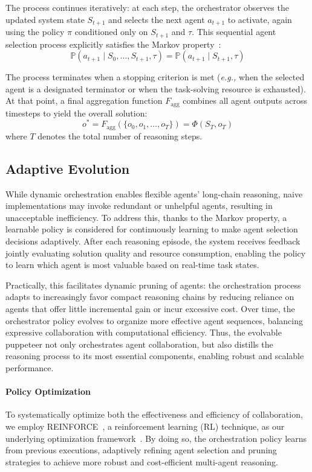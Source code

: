 \documentclass{article}
\newcommand{\eg}{\textit{e.g., }}
\begin{document}
The process continues iteratively: at each step, the orchestrator observes the updated system state \(S_{t+1}\) and selects the next agent \(a_{t+1}\) to activate, again using the policy \(\pi\) conditioned only on \(S_{t+1}\) and \(\tau\).
This sequential agent selection process explicitly satisfies the Markov property~\cite{markov}:
\begin{equation}
\mathbb{P}(a_{t+1} \mid S_0, \dots, S_{t+1}, \tau) = \mathbb{P}(a_{t+1} \mid S_{t+1}, \tau)
\end{equation}

The process terminates when a stopping criterion is met (\eg when the selected agent is a designated terminator or when the task-solving resource is exhausted). At that point, a final aggregation function \(F_{\mathrm{agg}}\) combines all agent outputs across timesteps to yield the overall solution:
\begin{equation}
o^* = F_{\mathrm{agg}}(\{o_0, o_1, \dots, o_T\}) = \Phi(S_T, o_T)
\end{equation}
where \(T\) denotes the total number of reasoning steps. 

\subsection{Adaptive Evolution}
While dynamic orchestration enables flexible agents' long-chain reasoning, naive implementations may invoke redundant or unhelpful agents, resulting in unacceptable inefficiency. To address this, thanks to the Markov property, a learnable policy is considered for continuously learning to make agent selection decisions adaptively.
After each reasoning episode, the system receives feedback jointly evaluating solution quality and resource consumption, enabling the policy to learn which agent is most valuable based on real-time task states.

Practically, this facilitates dynamic pruning of agents: the orchestration process adapts to increasingly favor compact reasoning chains by reducing reliance on agents that offer little incremental gain or incur excessive cost. Over time, the orchestrator policy evolves to organize more effective agent sequences, balancing expressive collaboration with computational efficiency. Thus, the evolvable puppeteer not only orchestrates agent collaboration, but also distills the reasoning process to its most essential components, enabling robust and scalable performance.


\paragraph{Policy Optimization}
To systematically optimize both the effectiveness and efficiency of collaboration, we employ REINFORCE~\cite{NIPS1999_464d828b}, a reinforcement learning (RL) technique, as our underlying optimization framework~\cite{mezghani2023think,10.5555/3600270.3602532,pmlr-v235-xu24ad,shinn2023reflexion}. By doing so, the orchestration policy learns from previous executions, adaptively refining agent selection and pruning strategies to achieve more robust and cost-efficient multi-agent reasoning.
\end{document}

